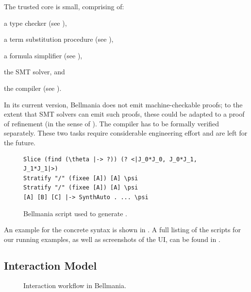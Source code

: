 \cbstart{}%
The trusted core is small, comprising of:
\begin{enumerate*}[label=(\textit{\alph*})]
 \item a type checker (see ), 
 \item a term substitution procedure (see ),
 \item a formula simplifier (see ),
 \item the SMT solver, and
 \item the compiler (see ).
\end{enumerate*}
In its current version, Bellmania does not emit machine-checkable
proofs; to the extent that SMT solvers can emit such proofs,
these could be adapted to a proof of refinement (in the sense of \cite{POPL15/Delaware}).
The compiler has to be formally verified separately.
These two tasks require considerable engineering effort and are left for the future.
\cbend

\begin{figure}
\vspace{-.5em}%
\begin{lstlisting}[language=bellmania]
Slice (find (\theta |-> ?)) (? <|J_0*J_0, J_0*J_1, J_1*J_1|>)
Stratify "/" (fixee [A]) [A] \psi
Stratify "/" (fixee [A]) [A] \psi
[A] [B] [C] |-> SynthAuto . ... \psi
\end{lstlisting}
\caption{\label{overview:script}
  Bellmania script used to generate .}
\end{figure}

An example for the concrete syntax is shown in .
A full listing of the scripts for our running examples,
as well as screenshots of the UI, can be found
in .

\subsection*{Interaction Model}

\begin{figure}[b!]
\caption{\label{overview:flow}
  Interaction workflow in Bellmania.}
\end{figure}

